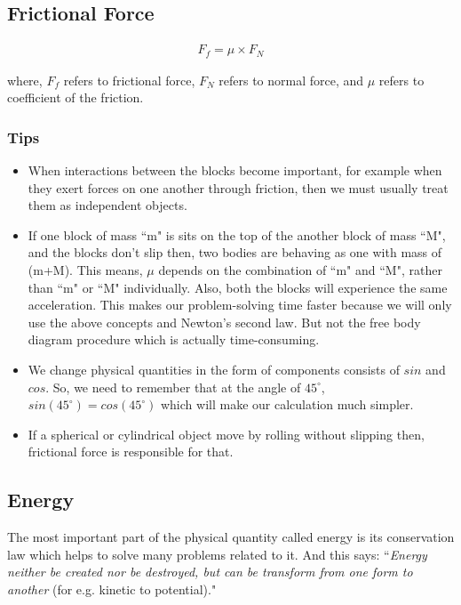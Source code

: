 \documentclass[12pt,a4paper]{article}
\begin{document}
\subsection{Frictional Force}

\begin{align}
F_{f} = \mu \times F_{N}
\end{align}

where, $F_{f}$ refers to frictional force, $F_{N}$ refers to normal force, and $\mu$ refers to coefficient of the friction.

\subsubsection*{Tips}

\begin{itemize}
\item When interactions between the blocks become important, for example when they exert forces on one another through friction, then we must usually treat them as independent objects.

\item If one block of mass ``m" is sits on the top of the another block of mass ``M", and the blocks don't slip then, two bodies are behaving as one with mass of (m+M).  This means, $\mu$ depends on the combination of ``m" and ``M", rather than ``m" or ``M" individually. Also, both the blocks will experience the same acceleration. This makes our problem-solving time faster because we will only use the above concepts and Newton's second law. But not the free body diagram procedure which is actually time-consuming.

\item We change physical quantities in the form of components consists of $sin$ and $cos$. So, we need to remember that at the angle of $45^{\circ}$, $sin(45^{\circ}) = cos(45^{\circ})$ which will make our calculation much simpler.

\item If a spherical or cylindrical object move by rolling without slipping then, frictional force is responsible for that. 

\end{itemize}

\subsection{Energy}

The most important part of the physical quantity called energy is its conservation law which helps to solve many problems related to it. And this says: ``\emph{Energy neither be created nor be destroyed, but can be \emph{transform} from one form to another} (for e.g. kinetic to potential)."
\end{document}
